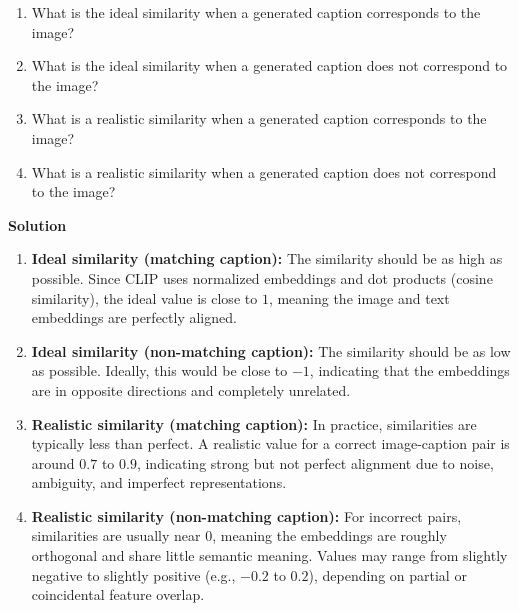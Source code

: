\documentclass[10pt]{article}
\begin{document}
\begin{enumerate}[label=\roman*.]
    \item What is the ideal similarity when a generated caption corresponds to the image?
    \item What is the ideal similarity when a generated caption does not correspond to the image?
    \item What is a realistic similarity when a generated caption corresponds to the image?
    \item What is a realistic similarity when a generated caption does not correspond to the image?
\end{enumerate}

\textbf{Solution}

\begin{enumerate}[label=\roman*.]
	
	\item \textbf{Ideal similarity (matching caption):}  
	The similarity should be as high as possible. Since CLIP uses normalized embeddings and dot products (cosine similarity), the ideal value is close to $1$, meaning the image and text embeddings are perfectly aligned.
	
	\item \textbf{Ideal similarity (non-matching caption):}  
	The similarity should be as low as possible. Ideally, this would be close to $-1$, indicating that the embeddings are in opposite directions and completely unrelated.
	
	\item \textbf{Realistic similarity (matching caption):}  
	In practice, similarities are typically less than perfect. A realistic value for a correct image-caption pair is around $0.7$ to $0.9$, indicating strong but not perfect alignment due to noise, ambiguity, and imperfect representations.
	
	\item \textbf{Realistic similarity (non-matching caption):}  
	For incorrect pairs, similarities are usually near $0$, meaning the embeddings are roughly orthogonal and share little semantic meaning. Values may range from slightly negative to slightly positive (e.g., $-0.2$ to $0.2$), depending on partial or coincidental feature overlap.
	
\end{enumerate}
\end{document}
